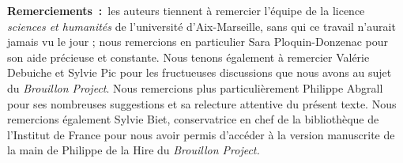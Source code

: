 \documentclass[12pt, a4paper]{article}
\begin{document}

%
%

\newpage

\noindent \textbf{Remerciements~:}~les auteurs tiennent à remercier l'équipe de la licence \textit{sciences et humanités} de l'université d'Aix-Marseille, sans qui ce travail n'aurait jamais vu le jour ; nous remercions en particulier Sara Ploquin-Donzenac pour son aide précieuse et constante. Nous tenons également à remercier  Valérie Debuiche et Sylvie Pic pour les fructueuses discussions que nous avons au sujet du \textit{Brouillon Project}. Nous remercions plus particulièrement Philippe Abgrall pour ses nombreuses suggestions et sa relecture attentive du présent texte. Nous remercions également Sylvie Biet, conservatrice en chef de la bibliothèque de l'Institut de France pour nous avoir permis d'accéder à la version manuscrite de la main de Philippe de la Hire du \textit{Brouillon Project.} 
\end{document}
